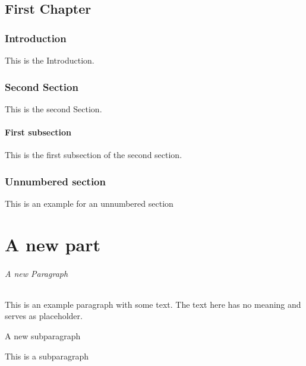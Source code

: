     \chapter{First Chapter} 
    \section{Introduction}
    This is the Introduction.
    \section{Second Section}
    This is the second Section.
    \subsection{First subsection}
    This is the first subsection of the second section.
    \section*{Unnumbered section}
    This is an example for an unnumbered section

    \part{A new part} %
    \paragraph{A new Paragraph}
    This is an example paragraph with some text. The text here has no meaning 
    and serves as placeholder.
    \subparagraph{A new subparagraph}
    This is a subparagraph
    
